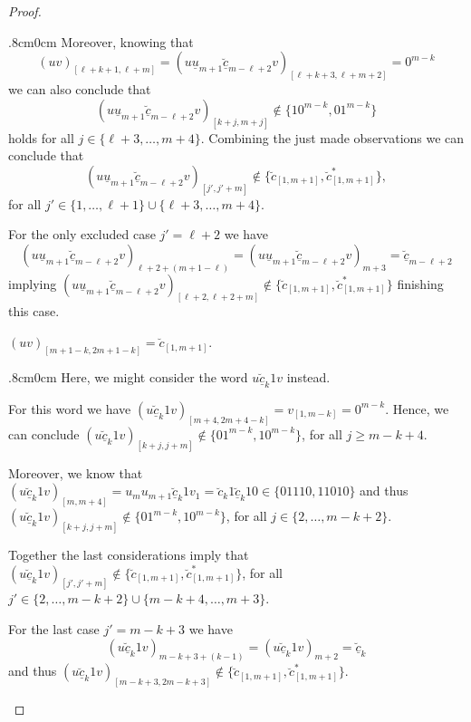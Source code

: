 \documentclass[11pt,reqno]{amsart}
\theoremstyle{plain}
\theoremstyle{definition}
\begin{document}
\begin{proof}
\begin{adjustwidth}{.8cm}{0cm}
Moreover, knowing that 
$$(uv)_{[\ell+k+1,\ell+m]}=(u\underline{u}_{m+1}\breve{\underline{c}}_{m-\ell+2}v)_{[\ell+k+3,\ell+m+2]}=0^{m-k}$$
we can also conclude that 
$$(u\underline{u}_{m+1}\breve{\underline{c}}_{m-\ell+2}v)_{[k+j,m+j]}\notin\{10^{m-k}, 01^{m-k}\}$$
holds for all $j\in \{\ell+3,\ldots, m+4\}$.
Combining the just made observations we can conclude that 
$$(u\underline{u}_{m+1}\breve{\underline{c}}_{m-\ell+2}v)_{[j',j'+m]}\notin \{\breve{c}_{[1,m+1]}, \breve{c}^\ast_{[1,m+1]}\},$$ for all 
$j'\in \{1,\ldots, \ell+1 \} \cup \{\ell+3,\ldots, m+4\}$.

For the only excluded case $j'= \ell+2$ we have 
$$(u\underline{u}_{m+1}\breve{\underline{c}}_{m-\ell+2}v)_{\ell+2+(m+1-\ell)}=(u\underline{u}_{m+1}\breve{\underline{c}}_{m-\ell+2}v)_{m+3}
=\breve{\underline{c}}_{m-\ell+2}$$
implying 
$(u\underline{u}_{m+1}\breve{\underline{c}}_{m-\ell+2}v)_{[\ell+2,\ell+2+m]}\notin \{ \breve{c}_{[1,m+1]}, \breve{c}^\ast_{[1,m+1]}\}$
finishing this case.
\end{adjustwidth}


 $(uv)_{[m+1-k, 2m+1-k]}=\breve{c}_{[1,m+1]}$. 

 \begin{adjustwidth}{.8cm}{0cm}
Here, we might consider the word 
$u\breve{\underline{c}}_k1v$ instead. 

For this word we have $(u\breve{\underline{c}}_k1v)_{[m+4,2m+4-k]}=v_{[1,m-k]}=0^{m-k}$. Hence, we can conclude
$(u\breve{\underline{c}}_k1v)_{[k+j,j+m]}\notin\{01^{m-k}, 10^{m-k}\}$, for all $j\geqslant m-k+4$.

Moreover, we know that 
$(u\breve{\underline{c}}_k1v)_{[m,m+4]}=u_mu_{m+1}\breve{\underline{c}}_k1v_1=\breve{c}_k1\breve{\underline{c}}_k10\in \{ 01110, 11010\}$ and thus 
$(u\breve{\underline{c}}_k1v)_{[k+j,j+m]}\notin \{01^{m-k}, 10^{m-k}\}$, for all $j\in \{2,\ldots, m-k+2\}$.


Together the last considerations imply that 
$(u\breve{\underline{c}}_k1v)_{[j',j'+m]}\notin \{\breve{c}_{[1,m+1]}, \breve{c}^\ast_{[1,m+1]}\}$, 
for all 
$j'\in \{2,\ldots, m-k+2\}\cup\{m-k+4,\ldots, m+3\}$.

For the last case $j'=m-k+3$ we have 
$$(u\breve{\underline{c}}_k1v)_{m-k+3+(k-1)}=(u\breve{\underline{c}}_k1v)_{m+2}
=\breve{\underline{c}}_{k}$$ 
and thus
$(u\breve{\underline{c}}_k1v)_{[m-k+3,2m-k+3]}\notin\{\breve{c}_{[1,m+1]}, \breve{c}^\ast_{[1,m+1]}\}$.
\end{adjustwidth}




\end{proof}
\end{document}
